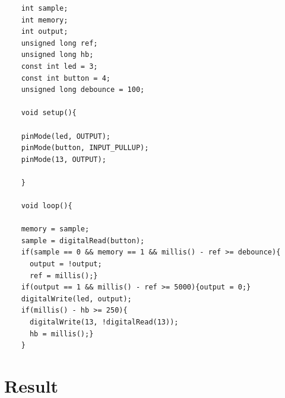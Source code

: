 \documentclass{scrartcl}                    %
\begin{document}
    \begin{lstlisting}
    int sample;                        
    int memory;                        
    int output;                        
    unsigned long ref;                 
    unsigned long hb;                  
    const int led = 3;                 
    const int button = 4;           
    unsigned long debounce = 100;     
    
    void setup(){
    
    pinMode(led, OUTPUT);              
    pinMode(button, INPUT_PULLUP);   
    pinMode(13, OUTPUT);    
    
    }
    
    void loop(){
    
    memory = sample;                                                  
    sample = digitalRead(button);                                   
    if(sample == 0 && memory == 1 && millis() - ref >= debounce){  
      output = !output;                                            
      ref = millis();}                                            
    if(output == 1 && millis() - ref >= 5000){output = 0;}        
    digitalWrite(led, output);                                        
    if(millis() - hb >= 250){
      digitalWrite(13, !digitalRead(13));
      hb = millis();}
    }  
    \end{lstlisting}


    \newpage

\section{Result}
\end{document}
